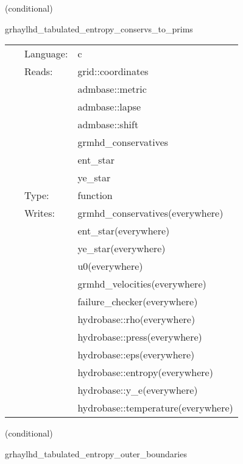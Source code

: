 \vspace{5mm}

   (conditional) 

\hspace{5mm} grhaylhd\_tabulated\_entropy\_conservs\_to\_prims 

\hspace{5mm}{\it entropy+tabulated version of grhaylhd\_conservs\_to\_prims } 


\hspace{5mm}

 \begin{tabular*}{160mm}{cll} 
~ & Language:  & c \\ 
~ & Reads:  & grid::coordinates \\ 
~& ~ &admbase::metric\\ 
~& ~ &admbase::lapse\\ 
~& ~ &admbase::shift\\ 
~& ~ &grmhd\_conservatives\\ 
~& ~ &ent\_star\\ 
~& ~ &ye\_star\\ 
~ & Type:  & function \\ 
~ & Writes:  & grmhd\_conservatives(everywhere) \\ 
~& ~ &ent\_star(everywhere)\\ 
~& ~ &ye\_star(everywhere)\\ 
~& ~ &u0(everywhere)\\ 
~& ~ &grmhd\_velocities(everywhere)\\ 
~& ~ &failure\_checker(everywhere)\\ 
~& ~ &hydrobase::rho(everywhere)\\ 
~& ~ &hydrobase::press(everywhere)\\ 
~& ~ &hydrobase::eps(everywhere)\\ 
~& ~ &hydrobase::entropy(everywhere)\\ 
~& ~ &hydrobase::y\_e(everywhere)\\ 
~& ~ &hydrobase::temperature(everywhere)\\ 
\end{tabular*} 


\vspace{5mm}

   (conditional) 

\hspace{5mm} grhaylhd\_tabulated\_entropy\_outer\_boundaries 

